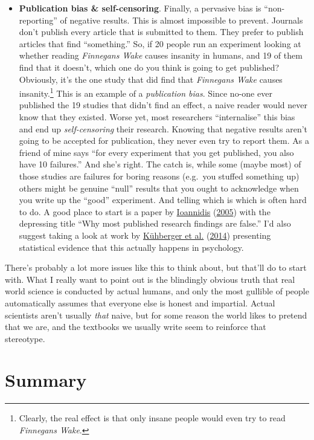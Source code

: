 \documentclass[
]{book}
\begin{document}
\begin{itemize}
\item
  {\textbf{Publication bias \& self-censoring}}. Finally, a pervasive bias is ``non-reporting'' of negative results. This is almost impossible to prevent. Journals don't publish every article that is submitted to them. They prefer to publish articles that find ``something.'' So, if 20 people run an experiment looking at whether reading \emph{Finnegans Wake} causes insanity in humans, and 19 of them find that it doesn't, which one do you think is going to get published? Obviously, it's the one study that did find that \emph{Finnegans Wake} causes insanity.\footnote{Clearly, the real effect is that only insane people would even try to read \emph{Finnegans Wake}.} This is an example of a \emph{publication bias}. Since no-one ever published the 19 studies that didn't find an effect, a naive reader would never know that they existed. Worse yet, most researchers ``internalise'' this bias and end up \emph{self-censoring} their research. Knowing that negative results aren't going to be accepted for publication, they never even try to report them. As a friend of mine says ``for every experiment that you get published, you also have 10 failures.'' And she's right. The catch is, while some (maybe most) of those studies are failures for boring reasons (e.g.~you stuffed something up) others might be genuine ``null'' results that you ought to acknowledge when you write up the ``good'' experiment. And telling which is which is often hard to do. A good place to start is a paper by \protect\hyperlink{ref-Ioannidis2005}{Ioannidis} (\protect\hyperlink{ref-Ioannidis2005}{2005}) with the depressing title ``Why most published research findings are false.'' I'd also suggest taking a look at work by \protect\hyperlink{ref-Kuhberger2014}{Kühberger et al.} (\protect\hyperlink{ref-Kuhberger2014}{2014}) presenting statistical evidence that this actually happens in psychology.
\end{itemize}

There's probably a lot more issues like this to think about, but that'll do to start with. What I really want to point out is the blindingly obvious truth that real world science is conducted by actual humans, and only the most gullible of people automatically assumes that everyone else is honest and impartial. Actual scientists aren't usually \emph{that} naive, but for some reason the world likes to pretend that we are, and the textbooks we usually write seem to reinforce that stereotype.

\hypertarget{summary}{%
\section{Summary}\label{summary}}
\end{document}

